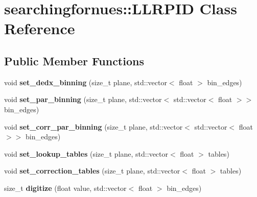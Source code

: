 \hypertarget{classsearchingfornues_1_1LLRPID}{}\section{searchingfornues\+:\+:L\+L\+R\+P\+ID Class Reference}
\label{classsearchingfornues_1_1LLRPID}
\subsection*{Public Member Functions}
\begin{DoxyCompactItemize}
\item 
void {\bfseries set\+\_\+dedx\+\_\+binning} (size\+\_\+t plane, std\+::vector$<$ float $>$ bin\+\_\+edges)\hypertarget{classsearchingfornues_1_1LLRPID_aec6761769b6881e7ebde2c73f24230cb}{}\label{classsearchingfornues_1_1LLRPID_aec6761769b6881e7ebde2c73f24230cb}

\item 
void {\bfseries set\+\_\+par\+\_\+binning} (size\+\_\+t plane, std\+::vector$<$ std\+::vector$<$ float $>$$>$ bin\+\_\+edges)\hypertarget{classsearchingfornues_1_1LLRPID_aa3b0a021bffa8f0f466ce8ae0f46af50}{}\label{classsearchingfornues_1_1LLRPID_aa3b0a021bffa8f0f466ce8ae0f46af50}

\item 
void {\bfseries set\+\_\+corr\+\_\+par\+\_\+binning} (size\+\_\+t plane, std\+::vector$<$ std\+::vector$<$ float $>$$>$ bin\+\_\+edges)\hypertarget{classsearchingfornues_1_1LLRPID_a8b11d5307ee3346d564a085c8736f9b6}{}\label{classsearchingfornues_1_1LLRPID_a8b11d5307ee3346d564a085c8736f9b6}

\item 
void {\bfseries set\+\_\+lookup\+\_\+tables} (size\+\_\+t plane, std\+::vector$<$ float $>$ tables)\hypertarget{classsearchingfornues_1_1LLRPID_a8596d9156bc1771641c3245e9cd71a94}{}\label{classsearchingfornues_1_1LLRPID_a8596d9156bc1771641c3245e9cd71a94}

\item 
void {\bfseries set\+\_\+correction\+\_\+tables} (size\+\_\+t plane, std\+::vector$<$ float $>$ tables)\hypertarget{classsearchingfornues_1_1LLRPID_a6abcb27f30a4e5086ecc60a0e944d9a0}{}\label{classsearchingfornues_1_1LLRPID_a6abcb27f30a4e5086ecc60a0e944d9a0}

\item 
size\+\_\+t {\bfseries digitize} (float value, std\+::vector$<$ float $>$ bin\+\_\+edges)\hypertarget{classsearchingfornues_1_1LLRPID_af605394ef38223a1600904c181828486}{}\label{classsearchingfornues_1_1LLRPID_af605394ef38223a1600904c181828486}


\end{DoxyCompactItemize}
